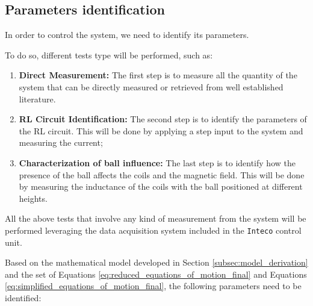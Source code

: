 \subsection{Parameters identification}
\label{subsec:parameters_identification}

In order to control the system, we need to identify its parameters.

To do so, different tests type will be performed, such as:

\begin{enumerate}
    \item \textbf{Direct Measurement:} The first step is to measure all the quantity of the system that can be directly measured or retrieved from well established literature.
    \item \textbf{RL Circuit Identification:} The second step is to identify the parameters of the RL circuit. This will be done by applying a step input to the system and measuring the current;
    \item \textbf{Characterization of ball influence:} The last step is to identify how the presence of the ball affects the coils and the magnetic field. This will be done by measuring the inductance of the coils with the ball positioned at different heights.
\end{enumerate}

All the above tests that involve any kind of measurement from the system will be performed leveraging the data acquisition system included in the \texttt{Inteco} control unit.

Based on the mathematical model developed in Section \ref{subsec:model_derivation} and the set of Equations \ref{eq:reduced_equations_of_motion_final} and Equations \ref{eq:simplified_equations_of_motion_final}, the following parameters need to be identified:

